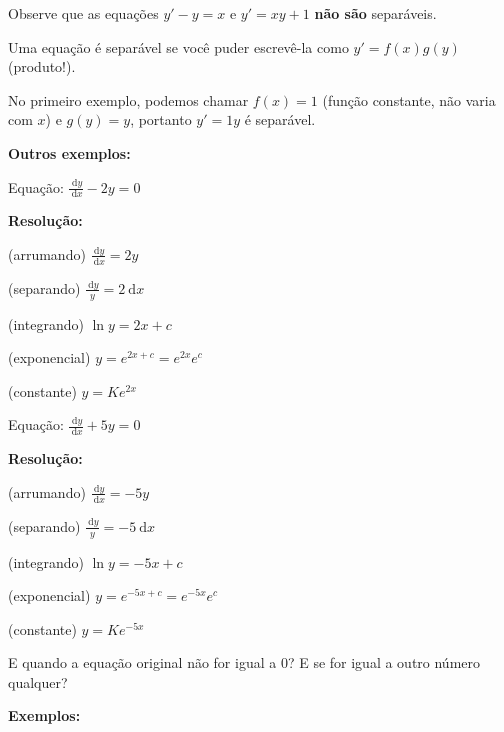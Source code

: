 \documentclass[a4paper]{article}
\newcommand{\ud}{\mathrm{\ d}}
\begin{document}
Observe que as equações $y' -y = x$ e $y' = xy + 1$ {\bf não são}
separáveis.

\smallskip

Uma equação é separável se você puder escrevê-la como $y' = f(x)g(y)$
(produto!).

\smallskip

No primeiro exemplo, podemos chamar $f(x)=1$ (função constante, não
varia com $x$) e $g(y)=y$, portanto $y'=1y$ é separável.

\newpage
{\bf Outros exemplos:}

\begin{multicols}{2}

Equação: $\frac{\ud y}{\ud x} - 2y =0$

{\bf Resolução:}

(arrumando) $\frac{\ud y}{\ud x} = 2y$

(separando) $\frac{\ud y}{y} = 2\ud x$

(integrando) $\ln y = 2x +c$

(exponencial) $y = e^{2x+c}=e^{2x}e^c$

(constante) $y=Ke^{2x}$
\columnbreak

Equação: $\frac{\ud y}{\ud x}  +5y =0$

{\bf Resolução:}

(arrumando) $\frac{\ud y}{\ud x} = -5y$

(separando) $\frac{\ud y}{y} = -5\ud x$

(integrando) $\ln y = -5x +c$

(exponencial) $y = e^{-5x+c}=e^{-5x}e^c$

(constante) $y=Ke^{-5x}$

\end{multicols}

E quando a equação original não for igual a 0? E se for igual a outro
número qualquer?

{\bf Exemplos:}
\end{document}
